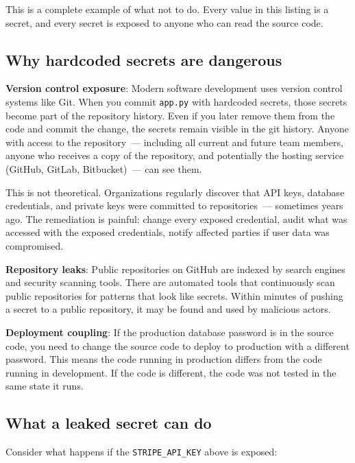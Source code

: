 \noindent{}This is a complete example of what not to do. Every value in this listing is a secret, and every secret is exposed to anyone who can read the source code.

\subsection*{Why hardcoded secrets are dangerous}\label{09-configuration-coupling:why-hardcoded-secrets-are-dangerous}

\textbf{Version control exposure}: Modern software development uses version control systems like Git. When you commit \texttt{app.py} with hardcoded secrets, those secrets become part of the repository history. Even if you later remove them from the code and commit the change, the secrets remain visible in the git history. Anyone with access to the repository~--- including all current and future team members, anyone who receives a copy of the repository, and potentially the hosting service (GitHub, GitLab, Bitbucket)~--- can see them.

This is not theoretical. Organizations regularly discover that API keys, database credentials, and private keys were committed to repositories~--- sometimes years ago. The remediation is painful: change every exposed credential, audit what was accessed with the exposed credentials, notify affected parties if user data was compromised.

\textbf{Repository leaks}: Public repositories on GitHub are indexed by search engines and security scanning tools. There are automated tools that continuously scan public repositories for patterns that look like secrets. Within minutes of pushing a secret to a public repository, it may be found and used by malicious actors.

\textbf{Deployment coupling}: If the production database password is in the source code, you need to change the source code to deploy to production with a different password. This means the code running in production differs from the code running in development. If the code is different, the code was not tested in the same state it runs.

\subsection*{What a leaked secret can do}\label{09-configuration-coupling:what-a-leaked-secret-can-do}

Consider what happens if the \texttt{STRIPE\_API\_KEY} above is exposed:

